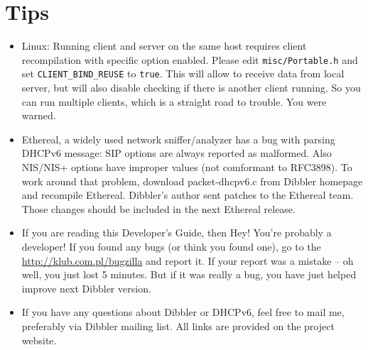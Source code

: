 
\section{Tips}

\begin{itemize}
\item Linux: Running client and server on the same host requires
  client recompilation with specific option enabled. Please edit
  \verb+misc/Portable.h+ and set \verb+CLIENT_BIND_REUSE+ to
  \verb+true+. This will allow to receive data from local server, but
  will also disable checking if there is another client running. So
  you can run multiple clients, which is a straight road to
  trouble. You were warned.
\item Ethereal, a widely used network sniffer/analyzer has a bug with
  parsing DHCPv6 message: SIP options are always reported as
  malformed. Also NIS/NIS+ options have improper values (not
  comformant to RFC3898). To work around that problem, download
  packet-dhcpv6.c from Dibbler homepage and recompile
  Ethereal. Dibbler's author sent patches to the Ethereal team. Those
  changes should be included in the next Ethereal release.
\item If you are reading this Developer's Guide, then Hey! You're
  probably a developer! If you found any bugs (or think you found
  one), go to the
  \href{http://klub.com.pl/bugzilla}{http://klub.com.pl/bugzilla}
   and report it. If your report was a mistake -- oh well, you just
  lost 5 minutes. But if it was really a bug, you have just helped improve
  next Dibbler version.
\item If you have any questions about Dibbler or DHCPv6, feel free to
  mail me, preferably via Dibbler mailing list. All links are provided
  on the project website.
\end{itemize}
